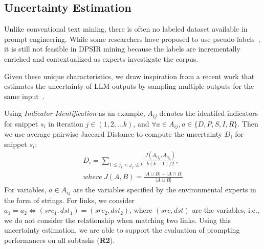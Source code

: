 \subsection{Uncertainty Estimation}
Unlike conventional text mining, there is often no labeled dataset available in prompt engineering. While some researchers have proposed to use pseudo-labels~\cite{malik2024pseudolabel}, it is still not feasible in DPSIR mining because the labels are incrementally enriched and contextualized as experts investigate the corpus. 

Given these unique characteristics, we draw inspiration from a recent work that estimates the uncertainty of LLM outputs by sampling multiple outputs for the same input~\cite{chen2024quantifyinguncertaitny}. 

Using \textit{Indicator Identification} as an example, $A_{ij}$ denotes the identifed indicators for snippet $s_i$ in iteration $j \in (1, 2,...k)$, and $\forall a \in A_{ij}, a \in \{D, P, S, I, R\}$. Then we use average pairwise Jaccard Distance to compute the uncertainty $D_i$ for snippet $s_i$:
\vspace*{-0.1cm}
\begin{equation}
\begin{split}
    D_i = \displaystyle \sum_{1 \leq j_1 < j_2 \leq k}\frac{J(A_{ij_1}, A_{ij_2})}{k(k-1)/2}, \\
    where \ J(A, B) = \frac{|A \cup B| - |A\cap B|}{|A \cup B|}
\end{split}
\end{equation}
For variables, $a \in A_{ij}$ are the variables specified by the environmental experts in the form of strings. For links, we consider $a_1=a_2 \Leftrightarrow (src_1, dst_1)= (src_2, dst_2)$, where $(src, dst)$ are the variables, i.e., we do not consider the relationship when matching two links. 
Using this uncertainty estimation, we are able to support the evaluation of prompting performances on all subtasks (\textbf{R2}).

